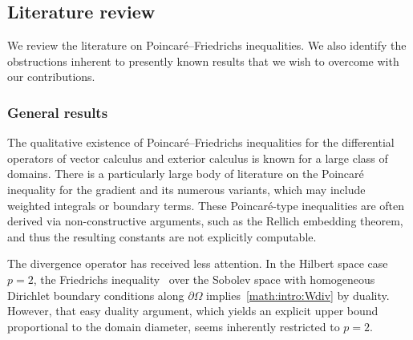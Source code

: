 \documentclass[10pt,a4paper]{article}
\begin{document}
\subsection{Literature review}


We review the literature on Poincar\'e--Friedrichs inequalities. We also identify the obstructions inherent to presently known results that we wish to overcome with our contributions. 

\subsubsection{General results}

The qualitative existence of Poincar\'e--Friedrichs inequalities for the differential operators of vector calculus and exterior calculus is known for a large class of domains. 
There is a particularly large body of literature on the Poincar\'e inequality for the gradient and its numerous variants,
which may include weighted integrals or boundary terms. 
These Poincar\'e-type inequalities are often derived via non-constructive arguments, such as the Rellich embedding theorem, 
and thus the resulting constants are not explicitly computable. 

The divergence operator has received less attention. 
In the Hilbert space case $p=2$, the Friedrichs inequality~\cite{burenkov1998sobolev} over the Sobolev space
with homogeneous Dirichlet boundary conditions along $\partial \Omega$ implies~\eqref{math:intro:Wdiv} by duality. 
However, that easy duality argument, which yields an explicit upper bound proportional to the domain diameter, seems inherently restricted to $p=2$. 

\end{document}
